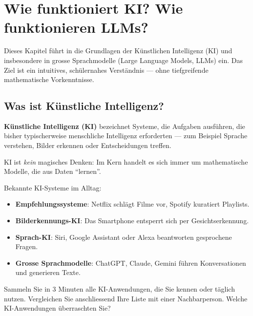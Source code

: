 \chapter{Wie funktioniert KI? Wie funktionieren LLMs?}\label{ch:K01_KI_Grundlagen}

\begin{myremark}
Dieses Kapitel führt in die Grundlagen der Künstlichen Intelligenz (KI) und insbesondere
in grosse Sprachmodelle (Large Language Models, LLMs) ein. Das Ziel ist ein intuitives,
schülernahes Verständnis --- ohne tiefgreifende mathematische Vorkenntnisse.
\end{myremark}

\section{Was ist Künstliche Intelligenz?}

\begin{mydefinition}
\textbf{Künstliche Intelligenz (KI)} bezeichnet Systeme, die Aufgaben ausführen, die
bisher typischerweise menschliche Intelligenz erforderten --- zum Beispiel Sprache
verstehen, Bilder erkennen oder Entscheidungen treffen.

KI ist \emph{kein} magisches Denken: Im Kern handelt es sich immer um mathematische
Modelle, die aus Daten \enquote{lernen}.
\end{mydefinition}

\begin{myexample}
Bekannte KI-Systeme im Alltag:
\begin{itemize}
    \item \textbf{Empfehlungssysteme}: Netflix schlägt Filme vor, Spotify kuratiert Playlists.
    \item \textbf{Bilderkennungs-KI}: Das Smartphone entsperrt sich per Gesichtserkennung.
    \item \textbf{Sprach-KI}: Siri, Google Assistant oder Alexa beantworten gesprochene Fragen.
    \item \textbf{Grosse Sprachmodelle}: ChatGPT, Claude, Gemini führen Konversationen
          und generieren Texte.
\end{itemize}
\end{myexample}

\begin{myexercise}[Brainstorming]
Sammeln Sie in 3 Minuten alle KI-Anwendungen, die Sie kennen oder täglich nutzen.
Vergleichen Sie anschliessend Ihre Liste mit einer Nachbarperson.
Welche KI-Anwendungen überraschten Sie?
\end{myexercise}

